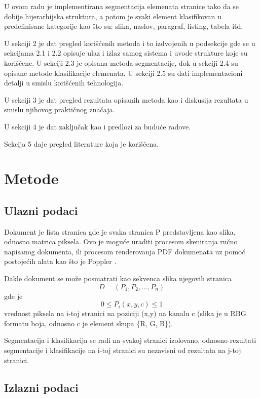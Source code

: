 \documentclass[]{amsart}
\begin{document}
U ovom radu je implementirana segmentacija elemenata stranice tako da se dobije hijerarhijska struktura, a potom je svaki element klasifikovan u predefinisane kategorije
kao što su: slika, naslov, paragraf, listing, tabela itd.

U sekciji 2 je dat pregled korišćenih metoda i to izdvojenih u podsekcije gde se u sekcijama 2.1 i 2.2 opisuje ulaz i izlaz samog sistema i uvode strukture koje su
koriščene. U sekciji 2.3 je opisana metoda segmentacije, dok u sekciji 2.4 su opisane metode klasifikacije elemenata. U sekciji 2.5 su dati implementacioni detalji
u smislu korišćenih tehnologija.

U sekciji 3 je dat pregled rezultata opisanih metoda kao i diskusija rezultata u smislu njihovog praktičnog značaja.

U sekciji 4 je dat zaključak kao i predlozi za buduće radove.

Sekcija 5 daje pregled literature koja je korišćena. 



\section{Metode}
\label{sec:orgdf3095c}
\subsection{Ulazni podaci}
\label{sec:org36199a1}

Dokument je lista stranica gde je svaka stranica P predstavljena kao slika, odnosno matrica piksela. Ovo je moguće uraditi procesom skeniranja ručno napisanog dokumenta, 
ili procesom renderovanja PDF dokumenata uz pomoć postojećih alata kao što je Poppler \cite{poppler}.

Dakle dokument se može posmatrati kao sekvenca slika njegovih stranica $$ D = (P_1, P_2, ..., P_n) $$ gde je $$ 0 \le P_{i}(x,y, c) \le 1$$ vrednost piksela na i-toj
stranici na poziciji (x,y) na kanalu c (slika je u RBG formatu boja, odnosno c je element skupa \{R, G, B\}).

Segmentacija i klasifikacija se radi na svakoj stranici izolovano, odnosno rezultati segmentacije i klasifikacije na i-toj stranici su nezavisni od rezultata na j-toj
stranici.


\subsection{Izlazni podaci}
\label{sec:org75e117b}
\end{document}
